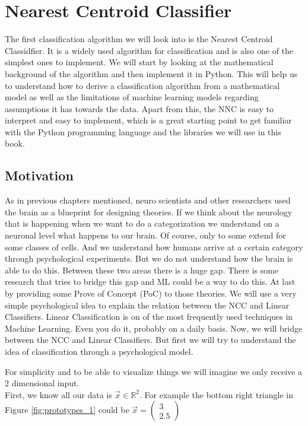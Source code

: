 \chapter{Nearest Centroid Classifier}
\label{ch:ncc}
The first classification algorithm we will look into is the Nearest Centroid Classidfier.
It is a widely used algorithm for classification and is also one of the simplest ones to implement.
We will start by looking at the mathematical background of the algorithm and then implement it in Python.
This will help us to understand how to derive a classification algorithm from a mathematical model as well as the
limitations of machine learning models regarding assumptions it has towards the data.
Apart from this, the NNC is easy to interpret and easy to implement, which is a great starting point to get familiar with 
the Python programming language and the libraries we will use in this book.

\section{Motivation}
As in previous chapters mentioned, neuro scientists and other researchers used the brain as a blueprint for
designing theories. If we think about the neurology that is happening when
we want to do a categorization we understand on a neuronal level what happens to our brain.
Of course, only to some extend for some classes of cells. And we understand how humans
arrive at a certain category through psychological experiments. But we do not understand
how the brain is able to do this.
Between these two areas there is a huge gap. There is some research that tries to bridge this gap and ML could be a way to do this.
At last by providing some Prove of Concept (PoC) to those theories.
We will use a very simple psychological idea to explain the relation between the NCC and Linear Classifiers.
Linear Classification is on of the most frequently used techniques in Machine Learning. Even you do it, probably on a daily basis.
Now, we will bridge between the NCC and Linear Classifiers. But first we will try to understand the idea of classification through a psychological model.


\newline
For simplicity and to be able to visualize things we will imagine we only receive a 2 dimensional input.\\
First, we know all our data is $\vec{x} \in \mathbb{R}^2$. For example the bottom right triangle in Figure \ref{fig:prototypes_1} could be 
$\vec{x} = \begin{pmatrix}3\\2.5\end{pmatrix}$

